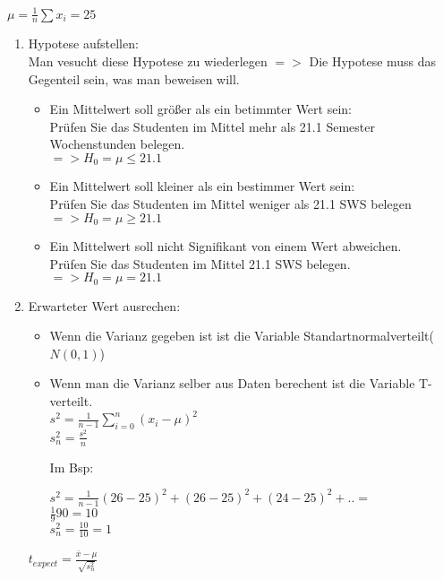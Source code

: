 \documentclass[a4paper, 11pt]{article}
\begin{document}
$\mu = \frac {1} {n} \sum x_i = 25$
\begin{enumerate}
  \item Hypotese aufstellen:\\
     Man vesucht diese Hypotese zu wiederlegen $=>$ Die Hypotese muss das Gegenteil sein, was man beweisen will.
     \begin {itemize}
       \item Ein Mittelwert soll größer als ein betimmter Wert sein:\\
         Prüfen Sie das Studenten im Mittel mehr als 21.1 Semester Wochenstunden belegen.\\
         $=> H_0 = \mu \leq 21.1$
       \item Ein Mittelwert soll kleiner als ein bestimmer Wert sein:\\
         Prüfen Sie das Studenten im Mittel weniger als 21.1 SWS belegen\\
         $=> H_0 = \mu \geq 21.1$
       \item Ein Mittelwert soll nicht Signifikant von einem Wert abweichen.\\
         Prüfen Sie das Studenten im Mittel 21.1 SWS belegen.\\
         $=> H_0 = \mu = 21.1$
     \end{itemize}

   \item Erwarteter Wert ausrechen: \\
     \begin {itemize}
       \item
         Wenn die Varianz gegeben ist ist die Variable Standartnormalverteilt($N(0,1)$)
       \item 
         Wenn man die Varianz selber aus Daten berechent ist die Variable T-verteilt.\\
         $s^2 = \frac 1 {n-1} \sum_{i = 0} ^ n (x_i - \mu) ^2$\\
       $s_n^2 = \frac {s^2} n$

         Im Bsp: 

         $s^2 = \frac 1 {n-1} (26 - 25)^2 +(26 - 25)^2 + (24 - 25)^2 + ..  = $\\
         $      \frac 1 {9} 90 = 10$\\
         $s_n^2 = \frac {10} {10} = 1$

     \end {itemize}

     $ t_{expect} = \frac{\bar{x} - \mu} { \sqrt{s_n^2}}$


\end{enumerate}
\end{document}
